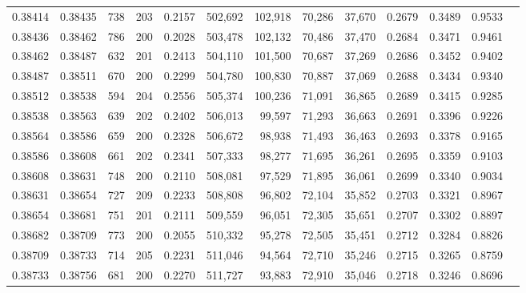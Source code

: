 \begin{tabular}{rrrrrrrrrrrrr}
0.38414 & 0.38435 &   738 & 203 &                                     0.2157 & 502,692 & 102,918 &  70,286 &  37,670 & 0.2679 & 0.3489 & 0.9533 \\
0.38436 & 0.38462 &   786 & 200 &                                     0.2028 & 503,478 & 102,132 &  70,486 &  37,470 & 0.2684 & 0.3471 & 0.9461 \\
0.38462 & 0.38487 &   632 & 201 &                                     0.2413 & 504,110 & 101,500 &  70,687 &  37,269 & 0.2686 & 0.3452 & 0.9402 \\
0.38487 & 0.38511 &   670 & 200 &                                     0.2299 & 504,780 & 100,830 &  70,887 &  37,069 & 0.2688 & 0.3434 & 0.9340 \\
0.38512 & 0.38538 &   594 & 204 &                                     0.2556 & 505,374 & 100,236 &  71,091 &  36,865 & 0.2689 & 0.3415 & 0.9285 \\
0.38538 & 0.38563 &   639 & 202 &                                     0.2402 & 506,013 &  99,597 &  71,293 &  36,663 & 0.2691 & 0.3396 & 0.9226 \\
0.38564 & 0.38586 &   659 & 200 &                                     0.2328 & 506,672 &  98,938 &  71,493 &  36,463 & 0.2693 & 0.3378 & 0.9165 \\
0.38586 & 0.38608 &   661 & 202 &                                     0.2341 & 507,333 &  98,277 &  71,695 &  36,261 & 0.2695 & 0.3359 & 0.9103 \\
0.38608 & 0.38631 &   748 & 200 &                                     0.2110 & 508,081 &  97,529 &  71,895 &  36,061 & 0.2699 & 0.3340 & 0.9034 \\
0.38631 & 0.38654 &   727 & 209 &                                     0.2233 & 508,808 &  96,802 &  72,104 &  35,852 & 0.2703 & 0.3321 & 0.8967 \\
0.38654 & 0.38681 &   751 & 201 &                                     0.2111 & 509,559 &  96,051 &  72,305 &  35,651 & 0.2707 & 0.3302 & 0.8897 \\
0.38682 & 0.38709 &   773 & 200 &                                     0.2055 & 510,332 &  95,278 &  72,505 &  35,451 & 0.2712 & 0.3284 & 0.8826 \\
0.38709 & 0.38733 &   714 & 205 &                                     0.2231 & 511,046 &  94,564 &  72,710 &  35,246 & 0.2715 & 0.3265 & 0.8759 \\
0.38733 & 0.38756 &   681 & 200 &                                     0.2270 & 511,727 &  93,883 &  72,910 &  35,046 & 0.2718 & 0.3246 & 0.8696 \\

\end{tabular}

